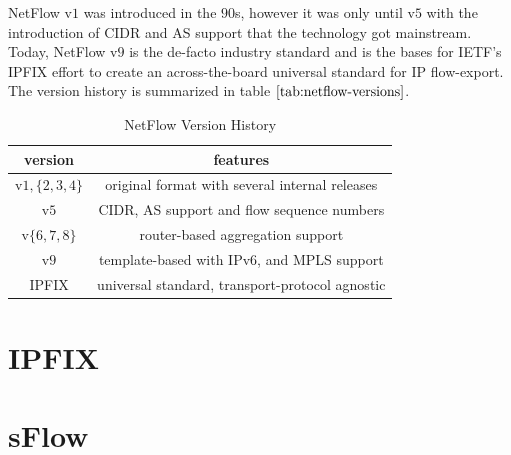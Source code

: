 NetFlow v$1$ was introduced in the $90$s, however it was only until v$5$ with the introduction of \ac{CIDR} and \ac{AS} support that the  technology got mainstream. Today, NetFlow v$9$ is the de-facto industry standard and is the bases for \ac{IETF}'s \ac{IPFIX} effort to create an across-the-board universal standard for \ac{IP} flow-export. The version history is summarized in table $\ref{tab:netflow-versions}$.
\begin{table}[h!]
	\begin{center}
		\begin{tabular}{|c|c|}
			\hline	
			version & features \\
			\hline
			\hline 
			v$1, \{2,3,4\}$ & original format with several internal releases \\
			\hline 
			v$5$ & \ac{CIDR}, \ac{AS} support and flow sequence numbers \\
			\hline
			v$\{6,7,8\}$ & router-based aggregation support \\
			\hline
			v$9$ & template-based with \ac{IP}v$6$, and \ac{MPLS} support \\
			\hline
			\ac{IPFIX} & universal standard, transport-protocol agnostic\\
			\hline
		\end{tabular}
	\end{center}
	\caption{NetFlow Version History}
\label{tab:netflow-versions}
\end{table}


\section{IPFIX}\label{sec:ipfix}
\section{sFlow}\label{sec:sflow}